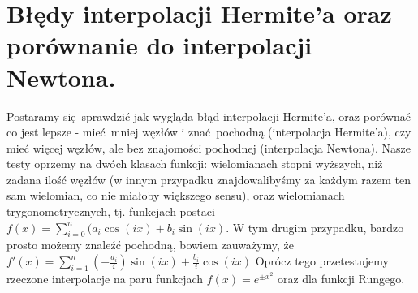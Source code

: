 \documentclass[10pt,wide]{mwart}
\theoremstyle{definition}
\begin{document}
\section{Błędy interpolacji Hermite'a oraz porównanie do interpolacji Newtona.}
Postaramy się sprawdzić jak wygląda błąd interpolacji Hermite'a, oraz porównać co jest lepsze -
mieć mniej węzłów i znać pochodną (interpolacja Hermite'a), czy mieć więcej węzłów, ale bez znajomości pochodnej (interpolacja Newtona).
Nasze testy oprzemy na dwóch klasach funkcji:
wielomianach stopni wyższych, niż zadana ilość węzłów
(w innym przypadku znajdowalibyśmy za każdym razem ten sam wielomian, co nie miałoby większego sensu),
oraz wielomianach trygonometrycznych, tj. funkcjach postaci \(f(x) = \sum_{i=0}^{n}(a_i\cos(ix) + b_i\sin(ix)\).
W tym drugim przypadku, bardzo prosto możemy znaleźć pochodną, bowiem zauważymy, że \(f'(x) = \sum_{i=1}^{n}(-\frac{a_i}{i})\sin(ix) + \frac{b_i}{i}\cos(ix)\)
Oprócz tego przetestujemy rzeczone interpolacje na paru funkcjach \(f(x) = e^{\pm x^2}\) oraz dla funkcji Rungego.
\end{document}
